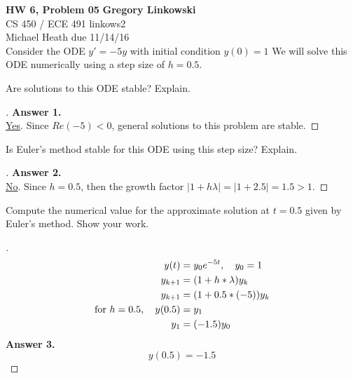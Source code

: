 \documentclass[12pt]{article}
\newenvironment{exercise}[2][Exercise]{\begin{trivlist}
\item[\hskip \labelsep {\bfseries #1}\hskip \labelsep {\bfseries #2.}]}{\end{trivlist}}
\begin{document}
\noindent
\large\textbf{HW 6, Problem 05} \hfill \textbf{Gregory Linkowski} \\
\normalsize CS 450 / ECE 491 \hfill linkows2 \\
Michael Heath \hfill due 11/14/16 \\


\vspace{5mm}
Consider the ODE $y′=−5y$ with initial condition $y(0)=1$ We will solve this ODE numerically using a step size of $h=0.5$.
\vspace{-2mm} \\

\vspace{10mm}
\begin{exercise}{1}
	Are solutions to this ODE stable? Explain.
\end{exercise} %
\begin{proof}[] \vspace{-2mm}
	\textbf{Answer 1.} \\ %
	\underline{Yes}. Since $Re(-5) < 0$, general solutions to this problem are stable.
\end{proof}

\vspace{10mm}
\begin{exercise}{2}
	Is Euler's method stable for this ODE using this step size? Explain.
\end{exercise} 
\begin{proof}[] \vspace{-2mm}
	\textbf{Answer 2.} \\ %
	\underline{No}. Since $h=0.5$, then the growth factor $|1 + h \lambda | = |1 + 2.5| = 1.5 > 1$. 
\end{proof}

\vspace{10mm}
\begin{exercise}{3}
	Compute the numerical value for the approximate solution at $t=0.5$ given by Euler's method. Show your work.
\end{exercise} 
\begin{proof}[] \vspace{-2mm}
	\begin{align*}
		y(t) &= y_0 e^{-5t}, \quad y_0 = 1 \\
		y_{k+1} &= (1 + h * \lambda) y_k \\
		y_{k+1} &= (1 + 0.5 * (-5)) y_k \\
		\textnormal{for } h = 0.5, \quad y(0.5) &= y_1 \\
		y_1 &= (-1.5) y_0
	\end{align*}
	\textbf{Answer 3.}  \vspace{-7mm} \\
	\[ \boxed{ y(0.5) = -1.5 } \]
\end{proof}
\end{document}
